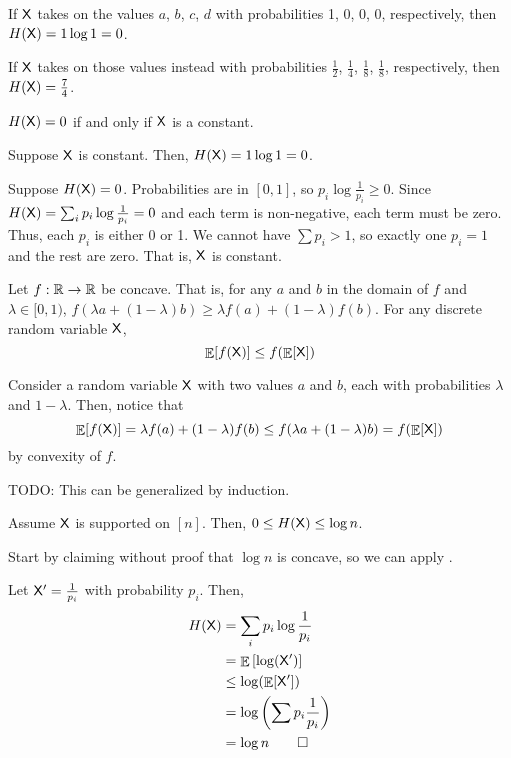 \documentclass[class=co432,notes,tikz]{agony}
\DeclareMathOperator*{\E}{\mathbb{E}}
\begin{document}
\begin{example}
  If $\mathsf X$ takes on the values $a$, $b$, $c$, $d$
  with probabilities 1, 0, 0, 0, respectively, then $H(\mathsf X) = 1 \log 1 = 0$.

  If $\mathsf X$ takes on those values instead with probabilities
  $\frac12$, $\frac14$, $\frac18$, $\frac18$, respectively,
  then $H(\mathsf X) = \frac74$.
\end{example}

\begin{fact}
  $H(\mathsf X) = 0$ if and only if $\mathsf X$ is a constant.
\end{fact}
\begin{prf}
  Suppose $\mathsf X$ is constant. Then, $H(\mathsf X) = 1 \log 1 = 0$.

  Suppose $H(\mathsf X) = 0$.
  Probabilities are in $[0,1]$, so $p_i \log \frac{1}{p_i} \geq 0$.
  Since $H(\mathsf X) = \sum_i p_i \log \frac{1}{p_i} = 0$
  and each term is non-negative, each term must be zero.
  Thus, each $p_i$ is either 0 or 1.
  We cannot have $\sum p_i > 1$, so exactly one $p_i = 1$ and the rest are zero.
  That is, $\mathsf X$ is constant.
\end{prf}

\begin{theorem}\label{thm:jensen}
  Let $f : \mathbb{R} \to \mathbb{R}$ be concave. That is,
  for any $a$ and $b$ in the domain of $f$ and $\lambda \in [0,1)$,
  $f(\lambda a + (1-\lambda)b) \geq \lambda f(a) + (1-\lambda)f(b)$.
  For any discrete random variable $\mathsf X$,
  \[ \E[f(\rv X)] \leq f(\E[\rv X]) \]
\end{theorem}
\begin{prf}
  Consider a random variable $\mathsf X$ with two values $a$ and $b$,
  each with probabilities $\lambda$ and $1-\lambda$.
  Then, notice that
  \[ \E[f(\rv X)] = \lambda f(a) + (1-\lambda) f(b) \leq f(\lambda a + (1-\lambda)b) = f(\E[\rv X]) \]
  by convexity of $f$.

  TODO: This can be generalized by induction.
\end{prf}

\begin{fact}
  Assume $\mathsf X$ is supported on $[n]$. Then, $0 \leq H(\mathsf X) \leq \log n$.
\end{fact}
\begin{prf}
  Start by claiming without proof that $\log n$ is concave, so we can apply
  .

  Let $\mathsf X' = \frac{1}{p_i}$ with probability $p_i$. Then,
  \begin{align*}
    H(\rv X) & = \sum_i p_i \log \frac{1}{p_i}    \\
             & = \E\qty[\log(\rv X')]             \\
             & \leq \log(\E[\rv X'])              \\
             & = \log\qty(\sum p_i \frac{1}{p_i}) \\
             & = \log n \qedhere
  \end{align*}
\end{prf}
\end{document}
